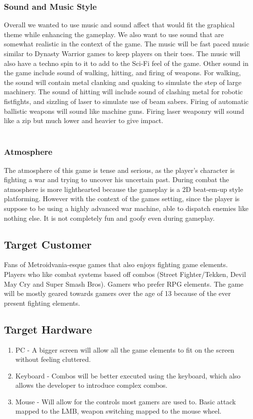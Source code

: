 \documentclass{article}
\begin{document}
    \subsubsection*{Sound and Music Style}
    Overall we wanted to use music and sound affect that would fit the graphical theme while enhancing the gameplay. We also want to use sound that are somewhat realistic in the context of the game. The music will be fast paced music similar to Dynasty Warrior games to keep players on their toes. The music will also have a techno spin to it to add to the Sci-Fi feel of the game. Other sound in the game include sound of walking, hitting, and firing of weapons. For walking, the sound will contain metal clanking and quaking to simulate the step of large machinery. The sound of hitting will include sound of clashing metal for robotic fistfights, and sizzling of laser to simulate use of beam sabers. Firing of automatic ballistic weapons will sound like machine guns. Firing laser weaponry will sound like a zip but much lower and heavier to give impact.\\\\
    \subsubsection*{Atmosphere}
The atmosphere of this game is tense and serious, as the player's character is fighting a war and trying to uncover his uncertain past. During combat the atmosphere is more lighthearted because the gameplay is a 2D beat-em-up style platforming. However with the context of the games setting, since the player is suppose to be using a highly advanced war machine, able to dispatch enemies like nothing else. It is not completely fun and goofy even during gameplay. 

\subsection*{Target Customer}
Fans of Metroidvania-esque games that also enjoys fighting game elements. Players who like combat systems based off combos (Street Fighter/Tekken, Devil May Cry and Super Smash Bros).
Gamers who prefer RPG elements. The game will be mostly geared towards gamers over the age of 13 because of the ever present fighting elements. 


\subsection*{Target Hardware}
    \begin{enumerate}
        \item PC - A bigger screen will allow all the game elements to fit on the screen without feeling cluttered. 
        \item Keyboard - Combos will be better executed using the keyboard, which also allows the developer to introduce complex combos.
        \item Mouse - Will allow for the controls most gamers are used to. Basic attack mapped to the LMB, weapon switching mapped to the mouse wheel.
    \end{enumerate}
    
\end{document}
